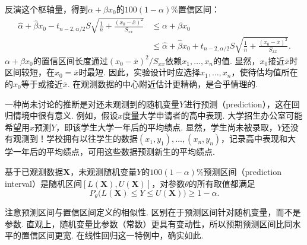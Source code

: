 反演这个枢轴量，得到$\alpha+\beta x_0$的$100(1-\alpha)\%$置信区间：
\begin{equation}\label{eq:11.3.40}
\begin{aligned}
\hat\alpha+\hat\beta x_0-t_{n-2,\alpha/2}S\sqrt{\frac1n+\frac{(x_0-\bar x)^2}{S_{xx}}}
&\le\alpha+\beta x_0\\
&\le\hat\alpha+\hat\beta x_0+t_{n-2,\alpha/2}S\sqrt{\frac1n+\frac{(x_0-\bar x)^2}{S_{xx}}}.
\end{aligned}
\end{equation}
$\alpha+\beta x_0$的置信区间长度通过$(x_0-\bar x)^2/S_{xx}$依赖$x_1,\ldots,x_n$的值. 显然，$x_0$接近$\bar x$时区间较短，在$x_0=\bar x$时最短. 因此，实验设计时应选择$x_1,\ldots,x_n$，使待估均值所在的$x_0$等于或接近$\bar x$. 在观测数据的中心附近估计更精确，是合乎情理的.

一种尚未讨论的推断是对还未观测到的随机变量$Y$进行预测（prediction），这在回归情境中很有意义. 例如，假设$x$度量大学申请者的高中表现. 大学招生办公室可能希望用$x$预测$Y$，即该学生大学一年后的平均绩点. 显然，学生尚未被录取，$Y$还没有观测到！学校拥有以往学生的数据$(x_1,y_1),\allowbreak\ldots,\allowbreak(x_n,y_n)$，记录高中表现和大学一年后的平均绩点，可用这些数据预测新生的平均绩点.

\begin{definition}\label{def:11.3.5}
基于已观测数据$\boldsymbol X$，未观测随机变量$Y$的$100(1-\alpha)\%$预测区间（prediction interval）是随机区间$[L(\boldsymbol X),U(\boldsymbol X)]$，对参数$\theta$的所有取值都满足
$$P_\theta\bigl(L(\boldsymbol X)\le Y\le U(\boldsymbol X)\bigr)\ge1-\alpha.$$
\end{definition}

注意预测区间与置信区间定义的相似性. 区别在于预测区间针对随机变量，而不是参数. 直观上，随机变量比参数（常数）更具有变动性，所以预期预测区间比同水平的置信区间更宽. 在线性回归这一特例中，确实如此.

